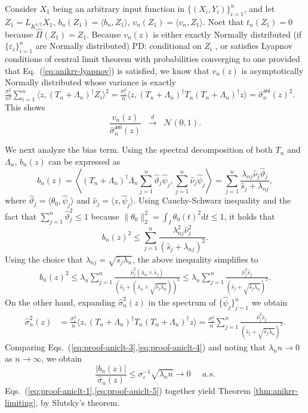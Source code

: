 \documentclass[aos]{imsart}
\renewcommand{\hat}{\widehat}
\newcommand{\ud}{\mathrm d}
\newcommand{\ani}{\mathsf{ani}}
\newcommand{\pd}[1]{%
	{ \color{blue} PD: #1}%
}
\theoremstyle{plain}
\theoremstyle{definition}
\theoremstyle{definition}
\begin{document}
\begin{appendix}
Consider $X_1$ being an arbitrary input function in $\{(X_i,Y_i)\}_{i=1}^n$,
and let $Z_1=L_{K^{1/2}}X_1$, $b_n(Z_1)=\langle b_n,Z_1\rangle$, $v_n(Z_1)=\langle v_n,Z_1\rangle$.
Noet that $t_n(Z_1)=0$ because $\hat\Pi(Z_1)=Z_1$.
Because $v_n(z)$ is either exactly Normally distributed (if $\{\varepsilon_i\}_{i=1}^n$ are Normally distributed) \pd{conditional on $Z_i$}, or satisfies Lyapnov conditions of central limit theorem with probabilities converging to one
provided that Eq.~(\ref{eq:anikrr-lyapnov}) is satisfied, we know that $v_n(z)$ is asymptotically Normally distributed whose variance is exactly $\frac{\sigma_\varepsilon^2}{n^2}\sum_{i=1}^n\langle z, (T_n+\Lambda_n)^{\dagger}Z_i\rangle^2 = \frac{\sigma_\varepsilon^2}{n}\langle z, (T_n+\Lambda_n)^{\dagger}T_n(T_n+\Lambda_n)^{\dagger}z\rangle=\hat\sigma_n^\ani(z)^2$. This shows
\begin{equation}
\frac{v_n(z)}{\hat\sigma_n^\ani(z)}\;\;\overset{d}{\to}\;\;\mathcal N(0,1).
\label{eq:proof-aniclt-2}
\end{equation}

We next analyze the bias term. Using the spectral decomposition of both $T_n$ and $\Lambda_n$, $b_n(z)$ can be expressed as
$$
b_n(z) = \left\langle(T_n+\Lambda_n)^{\dagger}\Lambda_n\sum_{j=1}^n\hat\vartheta_j\hat\psi_j, \sum_{j=1}^n\hat\nu_j\hat\psi_j\right\rangle = \sum_{j=1}^n\frac{\lambda_{nj}\hat\nu_j\hat\vartheta_j}{\hat s_j+\lambda_{nj}},
$$
where $\hat\vartheta_j=\langle\theta_0,\hat\psi_j\rangle$ and $\hat\nu_j = \langle z,\hat\psi_j\rangle$.
Using Cauchy-Schwarz inequality and the fact that $\sum_{j=1}^n\hat\vartheta_j^2\leq 1$ because $\|\theta_0\|_2^2 = \int_I\theta_0(t)^2\ud t\leq 1$, it holds that
$$
b_n(z)^2 \leq \sum_{j=1}^n\frac{\lambda_{nj}^2\hat\nu_j^2}{(\hat s_j+\lambda_{nj})^2}.
$$
Using the choice that $\lambda_{nj}= \sqrt{\hat s_j\lambda_n}$, the above inequality simplifies to
\begin{align}
b_n(z)^2 \leq \lambda_n\sum_{j=1}^n\frac{\hat\nu_j^2(\lambda_n\wedge\hat s_j)}{(\hat s_j+(\lambda_n\wedge\sqrt{\hat s_j\lambda_n}))^2}\leq \lambda_n\sum_{j=1}^n\frac{\hat\nu_j^2\hat s_j}{(\hat s_j+\sqrt{\hat s_j\lambda_n})^2}.
\label{eq:proof-aniclt-3}
\end{align}
On the other hand, expanding $\hat\sigma_n^2(z)$ in the spectrum of $\{\hat\psi_j\}_{j=1}^n$ we obtain
\begin{align}
\hat\sigma_n^2(z) &= \frac{\sigma_\varepsilon^2}{n}\langle z, (T_n+\Lambda_n)^{\dagger}T_n(T_n+\Lambda_n)^{\dagger}z\rangle = \frac{\sigma_\varepsilon^2}{n}\sum_{j=1}^n\frac{\hat\nu_j^2\hat s_j}{(\hat s_j+\sqrt{\hat s_j\lambda_n})^2}.
\label{eq:proof-aniclt-4}
\end{align}
Comparing Eqs.~(\ref{eq:proof-aniclt-3},\ref{eq:proof-aniclt-4}) and noting that $\lambda_n n\to0$ as $n\to\infty$, we obtain
\begin{equation}
\frac{|b_n(z)|}{\hat\sigma_n(z)} \leq \sigma_\varepsilon^{-1}\sqrt{\lambda_n n} \to 0\;\;\;\;\;a.s.
\label{eq:proof-aniclt-5}
\end{equation}
Eqs.~(\ref{eq:proof-aniclt-1},\ref{eq:proof-aniclt-5}) together yield Theorem \ref{thm:anikrr-limiting}, by Slutsky's theorem.


\end{appendix}
\end{document}
